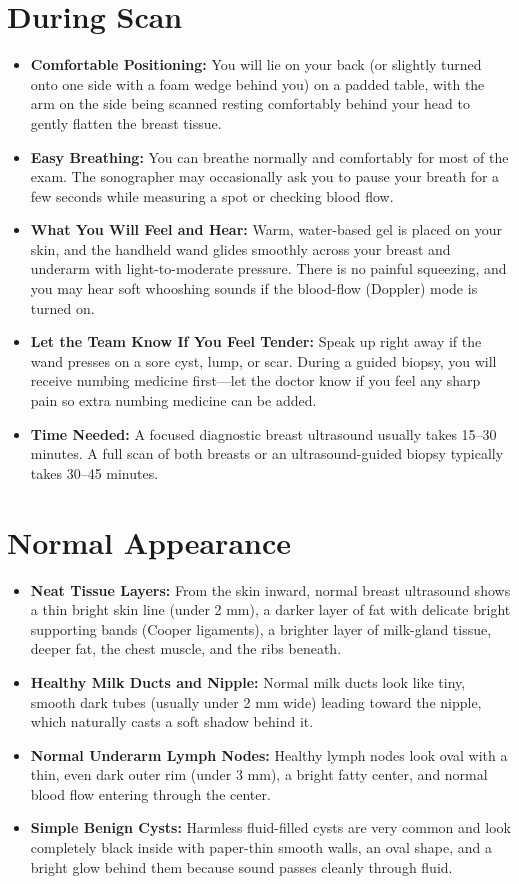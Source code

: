 \section{During Scan}
\begin{itemize}
\item \textbf{Comfortable Positioning:} You will lie on your back (or slightly turned onto one side with a foam wedge behind you) on a padded table, with the arm on the side being scanned resting comfortably behind your head to gently flatten the breast tissue.
\item \textbf{Easy Breathing:} You can breathe normally and comfortably for most of the exam. The sonographer may occasionally ask you to pause your breath for a few seconds while measuring a spot or checking blood flow.
\item \textbf{What You Will Feel and Hear:} Warm, water-based gel is placed on your skin, and the handheld wand glides smoothly across your breast and underarm with light-to-moderate pressure. There is no painful squeezing, and you may hear soft whooshing sounds if the blood-flow (Doppler) mode is turned on.
\item \textbf{Let the Team Know If You Feel Tender:} Speak up right away if the wand presses on a sore cyst, lump, or scar. During a guided biopsy, you will receive numbing medicine first---let the doctor know if you feel any sharp pain so extra numbing medicine can be added.
\item \textbf{Time Needed:} A focused diagnostic breast ultrasound usually takes 15--30 minutes. A full scan of both breasts or an ultrasound-guided biopsy typically takes 30--45 minutes.
\end{itemize}

\section{Normal Appearance}
\begin{itemize}
\item \textbf{Neat Tissue Layers:} From the skin inward, normal breast ultrasound shows a thin bright skin line (under 2 mm), a darker layer of fat with delicate bright supporting bands (Cooper ligaments), a brighter layer of milk-gland tissue, deeper fat, the chest muscle, and the ribs beneath.
\item \textbf{Healthy Milk Ducts and Nipple:} Normal milk ducts look like tiny, smooth dark tubes (usually under 2 mm wide) leading toward the nipple, which naturally casts a soft shadow behind it.
\item \textbf{Normal Underarm Lymph Nodes:} Healthy lymph nodes look oval with a thin, even dark outer rim (under 3 mm), a bright fatty center, and normal blood flow entering through the center.
\item \textbf{Simple Benign Cysts:} Harmless fluid-filled cysts are very common and look completely black inside with paper-thin smooth walls, an oval shape, and a bright glow behind them because sound passes cleanly through fluid.
\end{itemize}

